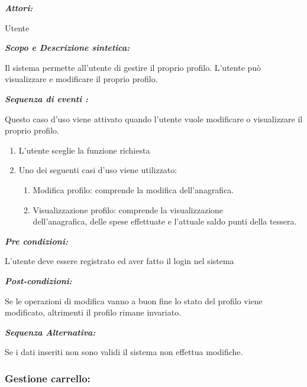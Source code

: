 \documentclass{article}
\begin{document}
\begin{mdframed}
	\noindent\textit{\textbf{Attori:}}


	Utente


	\noindent\textit{\textbf{Scopo e Descrizione sintetica:}}


	Il sistema permette all’utente di gestire il proprio profilo.
	L’utente può visualizzare e modificare il proprio profilo.

	\noindent\textit{\textbf{Sequenza di eventi :}}

	Questo caso d’uso viene attivato quando l’utente vuole modificare o visualizzare il proprio profilo.
	\begin{enumerate}
		\item L’utente sceglie la funzione richiesta
		\item Uno dei seguenti casi d’uso viene utilizzato:
		      \begin{enumerate}
			      \item{ Modifica profilo:
			            comprende la modifica dell'anagrafica.}
			      \item{Visualizzazione profilo: comprende la visualizzazione\\dell'anagrafica,
			            delle spese effettuate e l'attuale saldo punti della tessera.}
		      \end{enumerate}
	\end{enumerate}

	\noindent\textit{\textbf{Pre condizioni:}}


	L’utente deve essere registrato ed aver fatto il login 	nel sistema

	\noindent\textit{\textbf{Post-condizioni:}}


	Se le operazioni di modifica vanno a buon fine lo stato del profilo viene modificato,
	altrimenti il profilo rimane invariato.

	\noindent\textit{\textbf{Sequenza Alternativa:}}


	Se i dati inseriti non sono validi il sistema non effettua modifiche.
\end{mdframed}
\newpage

\subsubsection{Gestione carrello:}
\end{document}
